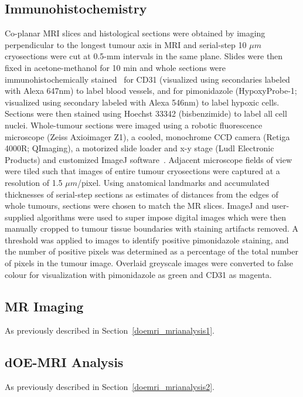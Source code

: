 \subsection{Immunohistochemistry}
Co-planar MRI slices and histological sections were obtained by imaging perpendicular to the longest tumour axis in MRI and serial-step 10 $\mu m$ cryosections were cut at 0.5-mm intervals in the same plane.
Slides were then fixed in acetone-methanol for 10 min and whole sections were immunohistochemically stained~\cite{Kalra:2017is} for \ac{CD31} (visualized using secondaries labeled with Alexa 647nm) to label blood vessels, and for pimonidazole (HypoxyProbe-1; visualized using secondary labeled with Alexa 546nm) to label hypoxic cells. 
Sections were then stained using Hoechst 33342 (bisbenzimide) to label all cell nuclei.
Whole-tumour sections were imaged using a robotic fluorescence microscope (Zeiss Axioimager Z1), a cooled, monochrome CCD camera (Retiga 4000R; QImaging), a motorized slide loader and x-y stage (Ludl Electronic Products) and customized ImageJ software~\cite{Collins:2007jr}. 
Adjacent microscope fields of view were tiled such that images of entire tumour cryosections were captured at a resolution of 1.5 $\mu m$/pixel. 
Using anatomical landmarks and accumulated thicknesses of serial-step sections as estimates of distances from the edges of whole tumours, sections were chosen to match the MR slices. 
ImageJ and user-supplied algorithms were used to super impose digital images which were then manually cropped to tumour tissue boundaries with staining artifacts removed. 
A threshold was applied to images to identify positive pimonidazole staining, and the number of positive pixels was determined as a percentage of the total number of pixels in the tumour image. 
Overlaid greyscale images were converted to false colour for visualization with pimonidazole as green and \ac{CD31} as magenta.

\subsection{MR Imaging}
As previously described in Section~\ref{doemri_mrianalysis1}.

\subsection{\ac{dOE-MRI} Analysis}

As previously described in Section~\ref{doemri_mrianalysis2}.

